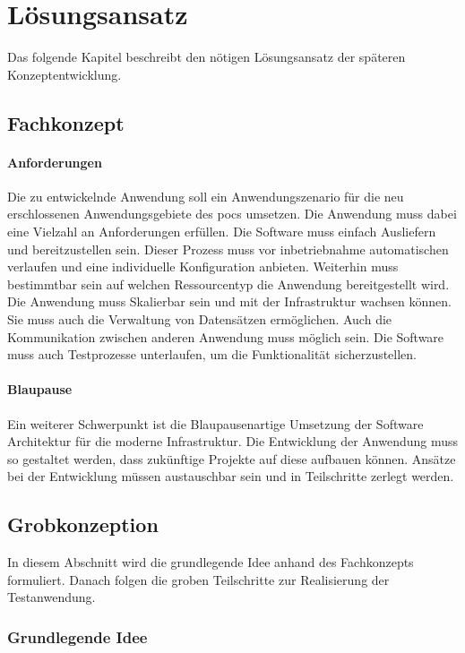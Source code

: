 \chapter{Lösungsansatz}
Das folgende Kapitel beschreibt den nötigen Lösungsansatz der späteren Konzeptentwicklung.

\section{Fachkonzept}

\subsubsection{Anforderungen}
Die zu entwickelnde Anwendung soll ein Anwendungszenario für die neu erschlossenen Anwendungsgebiete des \ac{poc}s umsetzen.
Die Anwendung muss dabei eine Vielzahl an Anforderungen erfüllen.
Die Software muss einfach Ausliefern und bereitzustellen sein.
Dieser Prozess muss vor inbetriebnahme automatischen verlaufen und eine individuelle Konfiguration anbieten.
Weiterhin muss bestimmtbar sein auf welchen Ressourcentyp die Anwendung bereitgestellt wird.
Die Anwendung muss Skalierbar sein und mit der Infrastruktur wachsen können.
Sie muss auch die Verwaltung von Datensätzen ermöglichen.
Auch die Kommunikation zwischen anderen Anwendung muss möglich sein.
Die Software muss auch Testprozesse unterlaufen, um die Funktionalität sicherzustellen.


\subsubsection{Blaupause}
Ein weiterer Schwerpunkt ist die Blaupausenartige Umsetzung der Software Architektur für die moderne Infrastruktur.
Die Entwicklung der Anwendung muss so gestaltet werden, dass zukünftige Projekte auf diese aufbauen können.
Ansätze bei der Entwicklung müssen austauschbar sein und in Teilschritte zerlegt werden.


\section{Grobkonzeption}
In diesem Abschnitt wird die grundlegende Idee anhand des Fachkonzepts formuliert.
Danach folgen die groben Teilschritte zur Realisierung der Testanwendung.


\subsection{Grundlegende Idee}\label{idee}


